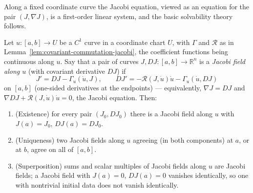 Along a fixed coordinate curve the Jacobi equation, viewed as an
equation for the pair $(J,\nabla J)$, is a first-order linear
system, and the basic solvability theory follows.

\begin{lemma}
\label{lem:jacobi-field-coordinates}
\leanok
Let $u\colon[a,b]\to U$ be a $C^1$ curve in a coordinate chart $U$,
with $\Gamma$ and ${\mathcal R}$ as in
Lemma~\ref{lem:covariant-commutation-jacobi}, the coefficient
functions being continuous along $u$. Say that a pair of curves
$J,DJ\colon[a,b]\to\mathbb{R}^n$ is a {\em Jacobi field along $u$}
(with covariant derivative $DJ$) if
$$J'=DJ-\Gamma_u(\dot u,J),\qquad
DJ'=-{\mathcal R}(J,\dot u)\dot u-\Gamma_u(\dot u,DJ)$$
on $[a,b]$ (one-sided derivatives at the endpoints) — equivalently,
$\nabla J=DJ$ and $\nabla DJ+{\mathcal R}(J,\dot u)\dot u=0$, the
Jacobi equation. Then:
\begin{enumerate}
\item (Existence) for every pair $(J_0,DJ_0)$ there is a Jacobi
field along $u$ with $J(a)=J_0$, $DJ(a)=DJ_0$.
\item (Uniqueness) two Jacobi fields along $u$ agreeing (in both
components) at $a$, or at $b$, agree on all of $[a,b]$.
\item (Superposition) sums and scalar multiples of Jacobi fields
along $u$ are Jacobi fields; a Jacobi field with $J(a)=0$,
$DJ(a)=0$ vanishes identically, so one with nontrivial initial
data does not vanish identically.
\end{enumerate}
\end{lemma}

